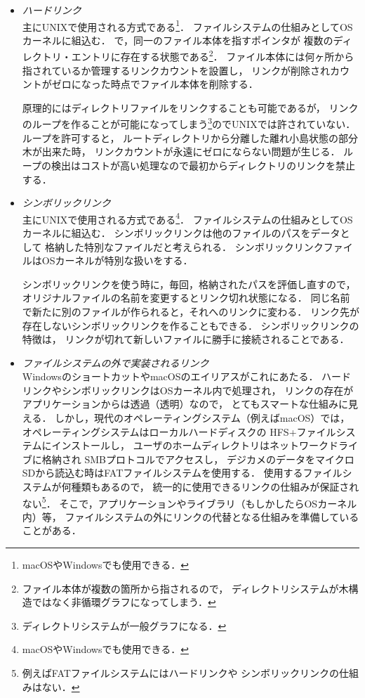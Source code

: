 \begin{itemize}
\item \emph{ハードリンク} \\
  主にUNIXで使用される方式である\footnote{macOSやWindowsでも使用できる．}．
  ファイルシステムの仕組みとしてOSカーネルに組込む．
  で，同一のファイル本体を指すポインタが
  複数のディレクトリ・エントリに存在する状態である\footnote{
    ファイル本体が複数の箇所から指されるので，
    ディレクトリシステムが木構造ではなく非循環グラフになってしまう．}．
  ファイル本体には何ヶ所から指されているか管理するリンクカウントを設置し，
  リンクが削除されカウントがゼロになった時点でファイル本体を削除する．

  原理的にはディレクトリファイルをリンクすることも可能であるが，
  リンクのループを作ることが可能になってしまう\footnote{
    ディレクトリシステムが一般グラフになる．}のでUNIXでは許されていない．
  ループを許可すると，
  ルートディレクトリから分離した離れ小島状態の部分木が出来た時，
  リンクカウントが永遠にゼロにならない問題が生じる．
  ループの検出はコストが高い処理なので最初からディレクトリのリンクを禁止する．

\item \emph{シンボリックリンク} \\
  主にUNIXで使用される方式である\footnote{macOSやWindowsでも使用できる．}．
  ファイルシステムの仕組みとしてOSカーネルに組込む．
  シンボリックリンクは他のファイルのパスをデータとして
  格納した特別なファイルだと考えられる．
  シンボリックリンクファイルはOSカーネルが特別な扱いをする．

  シンボリックリンクを使う時に，毎回，格納されたパスを評価し直すので，
  オリジナルファイルの名前を変更するとリンク切れ状態になる．
  同じ名前で新たに別のファイルが作られると，それへのリンクに変わる．
  リンク先が存在しないシンボリックリンクを作ることもできる．
  シンボリックリンクの特徴は，
  リンクが切れて新しいファイルに勝手に接続されることである．

\item \emph{ファイルシステムの外で実装されるリンク} \\
  WindowsのショートカットやmacOSのエイリアスがこれにあたる．
  ハードリンクやシンボリックリンクはOSカーネル内で処理され，
  リンクの存在がアプリケーションからは透過（透明）なので，
  とてもスマートな仕組みに見える．
  しかし，現代のオペレーティングシステム（例えばmacOS）では，
  オペレーティングシステムはローカルハードディスクの
  HFS+ファイルシステムにインストールし，
  ユーザのホームディレクトリはネットワークドライブに格納され
  SMBプロトコルでアクセスし，
  デジカメのデータをマイクロSDから読込む時はFATファイルシステムを使用する．
  使用するファイルシステムが何種類もあるので，
  統一的に使用できるリンクの仕組みが保証されない\footnote{
    例えばFATファイルシステムにはハードリンクや
    シンボリックリンクの仕組みはない．}．
  そこで，アプリケーションやライブラリ（もしかしたらOSカーネル内）等，
  ファイルシステムの外にリンクの代替となる仕組みを準備していることがある．


\end{itemize}
